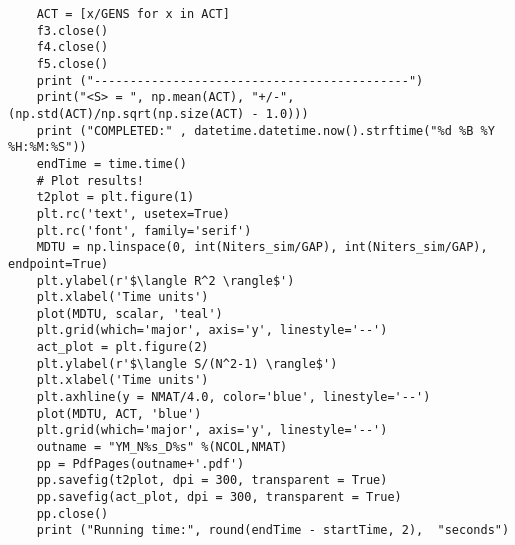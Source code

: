 \begin{lstlisting}
    ACT = [x/GENS for x in ACT] 
    f3.close()
    f4.close()
    f5.close()
    print ("--------------------------------------------")
    print("<S> = ", np.mean(ACT), "+/-", (np.std(ACT)/np.sqrt(np.size(ACT) - 1.0)))
    print ("COMPLETED:" , datetime.datetime.now().strftime("%d %B %Y %H:%M:%S")) 
    endTime = time.time() 
    # Plot results!
    t2plot = plt.figure(1) 
    plt.rc('text', usetex=True)
    plt.rc('font', family='serif')
    MDTU = np.linspace(0, int(Niters_sim/GAP), int(Niters_sim/GAP), endpoint=True)
    plt.ylabel(r'$\langle R^2 \rangle$')
    plt.xlabel('Time units')
    plot(MDTU, scalar, 'teal') 
    plt.grid(which='major', axis='y', linestyle='--')
    act_plot = plt.figure(2) 
    plt.ylabel(r'$\langle S/(N^2-1) \rangle$')
    plt.xlabel('Time units')
    plt.axhline(y = NMAT/4.0, color='blue', linestyle='--')
    plot(MDTU, ACT, 'blue') 
    plt.grid(which='major', axis='y', linestyle='--')
    outname = "YM_N%s_D%s" %(NCOL,NMAT)
    pp = PdfPages(outname+'.pdf')
    pp.savefig(t2plot, dpi = 300, transparent = True)
    pp.savefig(act_plot, dpi = 300, transparent = True)
    pp.close()
    print ("Running time:", round(endTime - startTime, 2),  "seconds")
\end{lstlisting}